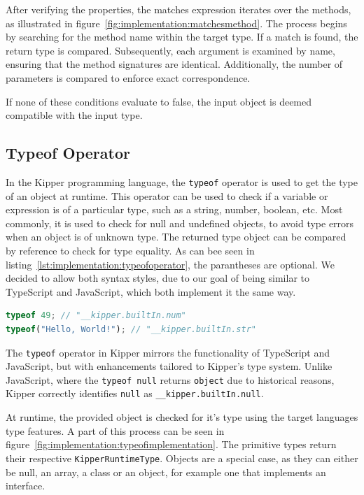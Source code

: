 After verifying the properties, the matches expression iterates over the methods, as illustrated in figure~\ref{fig:implementation:matchesmethod}. The process begins by searching for the method name within the target type. If a match is found, the return type is compared. Subsequently, each argument is examined by name, ensuring that the method signatures are identical. Additionally, the number of parameters is compared to enforce exact correspondence.

If none of these conditions evaluate to false, the input object is deemed compatible with the input type.

\subsection{Typeof Operator}
\label{sec:typeof}

In the Kipper programming language, the \lstinline|typeof| operator is used to get the type of an object at runtime. This operator can be used to check if a variable or expression is of a particular type, such as a string, number, boolean, etc. Most commonly, it is used to check for null and undefined objects, to avoid type errors when an object is of unknown type. The returned type object can be compared by reference to check for type equality. As can bee seen in listing~\ref{lst:implementation:typeofoperator}, the parantheses are optional. We decided to allow both syntax styles, due to our goal of being similar to TypeScript and JavaScript, which both implement it the same way.

\begin{lstlisting}[language=Typescript,caption=Typeof operator used to determine the type of an input expression,label=lst:implementation:typeofoperator]
typeof 49; // "__kipper.builtIn.num"
typeof("Hello, World!"); // "__kipper.builtIn.str"
\end{lstlisting}

The  \lstinline|typeof| operator in Kipper mirrors the functionality of TypeScript and JavaScript, but with enhancements tailored to Kipper's type system. Unlike JavaScript, where the  \lstinline|typeof null| returns \lstinline|object| due to historical reasons, Kipper correctly identifies  \lstinline|null| as  \lstinline|__kipper.builtIn.null|.

At runtime, the provided object is checked for it's type using the target languages type features. A part of this process can be seen in figure~\ref{fig:implementation:typeofimplementation}. The primitive types return their respective \lstinline|KipperRuntimeType|. Objects are a special case, as they can either be null, an array, a class or an object, for example one that implements an interface.

